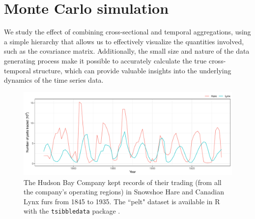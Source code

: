 \documentclass[a4paper,11pt]{article}
\theoremstyle{definition}
\begin{document}
\section{Monte Carlo simulation}\label{sec:mcsim}

We study the effect of combining cross-sectional and temporal aggregations, using a simple hierarchy that allows us to effectively visualize the quantities involved, such as the covariance matrix. Additionally, the small size and nature of the data generating process make it possible to accurately calculate the true cross-temporal structure, which can provide valuable insights into the underlying dynamics of the time series data.

\begin{figure}[!t]
	\centering
	\includegraphics[width = \linewidth]{fig/simAR/lynxhare.pdf}
	\caption{The Hudson Bay Company kept records of their trading (from all the company's operating regions) in Snowshoe Hare and Canadian Lynx furs from 1845 to 1935. The “pelt" dataset is available in R with the \texttt{tsibbledata} package \citep{ohara-wild2022}.}
	\label{fig:lynxhare}
\end{figure}
\end{document}
